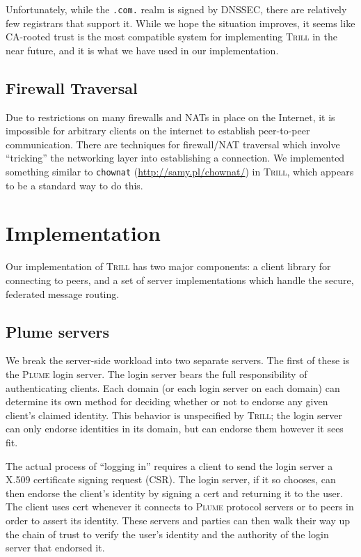 \documentclass[11pt]{article}
\newcommand{\Trill}{\textsc{Trill}\xspace}
\newcommand{\Plume}{\textsc{Plume}\xspace}
\begin{document}
Unfortunately, while the \verb`.com.` realm is signed by DNSSEC, there are
relatively few registrars that support it. While we hope the situation improves,
it seems like CA-rooted trust is the most compatible system for implementing
\Trill in the near future, and it is what we have used in our implementation.

\subsection{Firewall Traversal}
Due to restrictions on many firewalls and NATs in place on the Internet, it is
impossible for arbitrary clients on the internet to establish peer-to-peer
communication. There are techniques for firewall/NAT traversal which involve
``tricking'' the networking layer into establishing a connection. We implemented
something similar to \texttt{chownat} (\url{http://samy.pl/chownat/}) in \Trill,
which appears to be a standard way to do this.

\section{Implementation}

Our implementation of \Trill has two major components: a client library for
connecting to peers, and a set of server implementations which handle the
secure, federated message routing.

\subsection{Plume servers}

We break the server-side workload into two separate servers.  The first of
these is the \Plume login server.  The login server bears the full
responsibility of authenticating clients.  Each domain (or each login server on
each domain) can determine its own method for deciding whether or not to
endorse any given client's claimed identity.  This behavior is unspecified by
\Trill; the login server can only endorse identities in its domain, but can
endorse them however it sees fit.

The actual process of ``logging in'' requires a client to send the login server
a X.509 certificate signing request (CSR).  The login server, if it so chooses,
can then endorse the client's identity by signing a cert and returning it to
the user.  The client uses cert whenever it connects to \Plume protocol servers
or to peers in order to assert its identity.  These servers and parties can
then walk their way up the chain of trust to verify the user's identity and the
authority of the login server that endorsed it.
\end{document}
